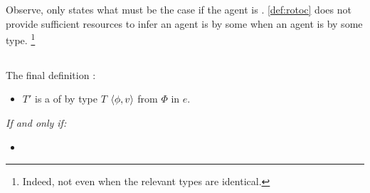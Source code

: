 \begin{note}
  Observe, \rotoc{} only states what must be the case if the agent is \tCV{}.
  \autoref{def:rotoc} does not provide sufficient resources to infer an agent is \tCV{} by some \torN{} when an agent is \ptCV{} by some type.%
  \footnote{
    Indeed, not even when the relevant types are identical.
  }
\end{note}


\subsection{}
\label{sec:rotoc}

\begin{note}
  The final definition :
\end{note}

\begin{note}
  \begin{definition}[A \rotoc{}]
    \label{def:rotoc}
    \newline

    \begin{itemize}
    \item
      \(T'\) is a \emph{\tRep{}} of \vAgent{} \tCV{} by type \(T\) \(\langle \phi, v \rangle\) from \(\Phi\) in \(e\).
    \end{itemize}

    \emph{If and only if:}

    \begin{itemize}
    \item
    \end{itemize}
    \vspace{-.5\baselineskip}
  \end{definition}


\end{note}
